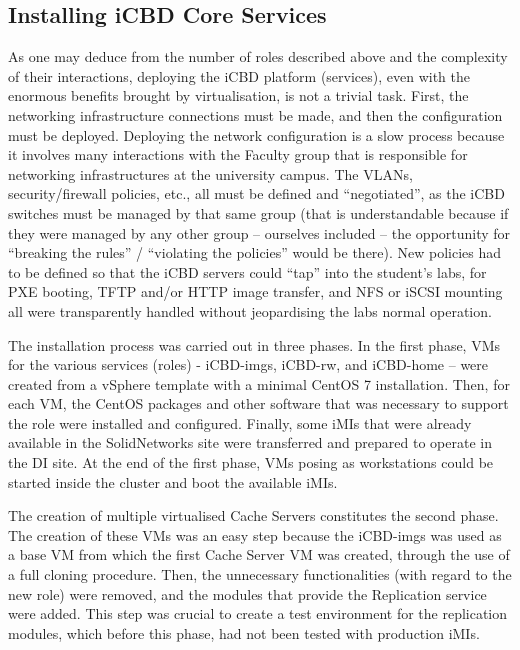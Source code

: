 \subsection{Installing iCBD Core Services}
\label{sub:impl_install_icbd_core}

As one may deduce from the number of roles described above and the complexity of their interactions, deploying the iCBD platform (services), even with the enormous benefits brought by virtualisation, is not a trivial task.
First, the networking infrastructure connections must be made, and then the configuration must be deployed. Deploying the network configuration is a slow process because it involves many interactions with the Faculty group that is responsible for networking infrastructures at the university campus. The VLANs, security/firewall policies, etc., all must be defined and “negotiated”, as the iCBD switches must be managed by that same group (that is understandable because if they were managed by any other group – ourselves included – the opportunity for “breaking the rules” / “violating the policies” would be there).  New policies had to be defined so that the iCBD servers could “tap” into the student’s labs, for PXE booting, TFTP and/or HTTP image transfer,  and NFS or iSCSI mounting all were transparently handled without jeopardising the labs normal operation.

The installation process was carried out in three phases. In the first phase, VMs for the various services (roles) - iCBD-imgs, iCBD-rw, and iCBD-home – were created from a vSphere template with a minimal CentOS 7 installation. Then, for each VM, the CentOS packages and other software that was necessary to support the role were installed and configured. Finally, some iMIs that were already available in the SolidNetworks site were transferred and prepared to operate in the DI site. At the end of the first phase, VMs posing as workstations could be started inside the cluster and boot the available iMIs.

The creation of multiple virtualised Cache Servers constitutes the second phase. The creation of these VMs was an easy step because the iCBD-imgs was used as a base VM from which the first Cache Server VM was created, through the use of a full cloning procedure. Then, the unnecessary functionalities (with regard to the new role) were removed, and the modules that provide the Replication service were added. This step was crucial to create a test environment for the replication modules, which before this phase, had not been tested with production iMIs.

